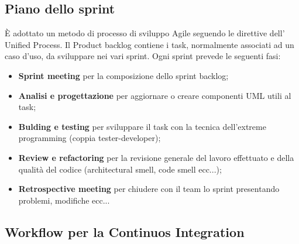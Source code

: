 \documentclass[12pt]{article}
\begin{document}
\subsection{Piano dello sprint}
\`{E} adottato un metodo di processo di sviluppo Agile seguendo le direttive dell' Unified Process. Il Product backlog contiene i task, normalmente associati ad un caso d'uso,  da sviluppare nei vari sprint. Ogni sprint prevede le seguenti fasi:
\begin{itemize}
\item {\textbf {Sprint meeting}} per la composizione dello sprint backlog;
\item {\textbf {Analisi e progettazione}}  per aggiornare o creare componenti UML utili al task;
\item {\textbf {Bulding e testing}}  per sviluppare il task con la tecnica dell'extreme programming (coppia tester-developer);
\item {\textbf {Review e refactoring}} per la revisione generale del lavoro effettuato e della qualità del codice (architectural smell, code smell ecc...);
\item {\textbf {Retrospective meeting}} per chiudere con il team lo sprint presentando problemi, modifiche ecc...

\end{itemize}

\subsection{Workflow per la Continuos Integration}


\end{document}
